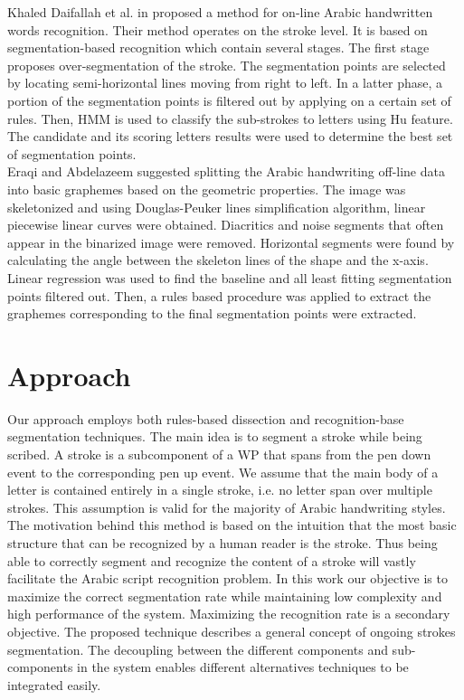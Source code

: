 \documentclass[journal,compsoc]{IEEEtran}
\begin{document}
Khaled Daifallah et al. in \cite{daifallah2009recognition} proposed a method for on-line Arabic handwritten words recognition. Their method operates on the stroke level. It is based on segmentation-based recognition which contain several stages. The first stage proposes over-segmentation of the stroke. The segmentation points are selected by locating semi-horizontal lines moving from right to left. In a latter phase, a portion of the segmentation points is filtered out by applying on a certain set of rules. Then, HMM is used to classify the sub-strokes to letters using Hu feature. The candidate and its scoring letters results were used to determine the best set of segmentation points. \\

Eraqi and Abdelazeem \cite{eraqi2012new} suggested splitting the Arabic handwriting off-line data into basic graphemes based on the geometric properties. The image was skeletonized and using Douglas-Peuker lines simplification algorithm, linear piecewise linear curves were obtained. Diacritics and noise segments that often appear in the binarized image were removed. Horizontal segments were found by calculating the angle between the skeleton lines of the shape and the x-axis. Linear regression was used to find the baseline and all least fitting segmentation points filtered out. Then, a rules based procedure was applied to extract the graphemes corresponding to the final segmentation points were extracted.    

\section{Approach}
\label{sec:approach}
Our approach employs both rules-based dissection and recognition-base segmentation techniques. The main idea is to segment a stroke while being scribed. A stroke is a subcomponent of a WP that spans from the pen down event to the corresponding pen up event. We assume that the main body of a letter is contained entirely in a single stroke, i.e. no letter span over multiple strokes. This assumption is valid for the majority of Arabic  handwriting styles. The motivation behind this method is based on the intuition that the most basic structure that can be recognized by a human reader is the stroke. Thus being able to correctly segment and recognize the content of a stroke will vastly facilitate the Arabic script recognition problem. In this work our objective is to maximize the correct segmentation rate while maintaining low complexity and high performance of the system. Maximizing the recognition rate is a secondary objective. 
The proposed technique describes a general concept of ongoing strokes segmentation. The decoupling between the different components and sub-components in the system enables different alternatives techniques to be integrated easily.\\ 
\end{document}
